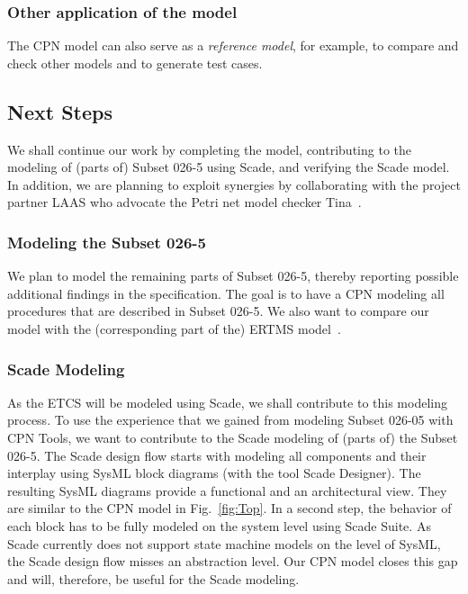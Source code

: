 \subsubsection{Other application of the model}

The CPN model can also serve as a \textit{reference model}, for example, to compare and check other models and to generate test cases.


\subsection{Next Steps}

We shall continue our work by completing the model, contributing to the modeling of (parts of) Subset 026-5 using Scade, and verifying the Scade model. In addition, we are planning to exploit synergies by collaborating with the project partner LAAS who advocate the Petri net model checker Tina~\cite{BerthomieuV2006}.


\subsubsection{Modeling the Subset 026-5}

We plan to model the remaining parts of Subset 026-5, thereby reporting possible additional findings in the specification. The goal is to have a CPN modeling all procedures that are described in Subset 026-5. We also want to compare our model with the (corresponding part of the) ERTMS model~\cite{ertms}.


\subsubsection{Scade Modeling}

As the ETCS will be modeled using Scade, we shall contribute to this modeling process. To use the experience that we gained from modeling Subset 026-05 with CPN Tools, we want to contribute to the Scade modeling of (parts of) the Subset 026-5. The Scade design flow starts with modeling all components and their interplay using SysML block diagrams (with the tool Scade Designer). The resulting SysML diagrams provide a functional and an architectural view. They are similar to the CPN model in Fig.~\ref{fig:Top}. In a second step, the behavior of each block has to be fully modeled on the system level using Scade Suite. As Scade currently does not support state machine models on the level of SysML, the Scade design flow misses an abstraction level. Our CPN model closes this gap and will, therefore, be useful for the Scade modeling.


